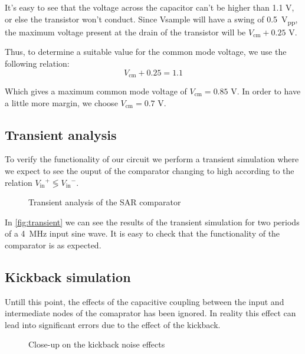 \documentclass{article}
\newcommand*{\subb}[1]{\ensuremath{_{\mathrm{#1}}}}
\begin{document}
 It’s easy to see that the voltage across the capacitor can’t be higher than 1.1 V, or else the transistor won’t conduct. Since Vsample will have a swing of \SI{0.5}{\volt_{pp}}, the maximum voltage present at the drain of the transistor will be $V\subb{cm} + 0.25$ V.

 Thus, to determine a suitable value for the common mode voltage, we use the following relation:
 \begin{equation}
  V\subb{cm} + 0.25=1.1
 \end{equation}

 Which gives a maximum common mode voltage of $V\subb{cm}=0.85$ V. In order to have a little more margin, we choose $V\subb{cm}=0.7$ V.


 \subsection{Transient analysis}
 To verify the functionality of our circuit we perform a transient simulation where we expect to see the ouput of the comparator changing to high according to the relation $V\subb{in}^+\lessgtr V\subb{in}^-$.

 \begin{figure}[!h]
  \centering
  \caption{Transient analysis of the SAR comparator}
  \label{fig:transient}
  
 \end{figure}

 In \autoref{fig:transient} we can see the results of the transient simulation for two periods of a \SI{4}{\MHz} input sine wave. It is easy to check that the functionality of the comparator is as expected.
 \subsection{Kickback simulation}
 Untill this point, the effects of the capacitive coupling between the input and intermediate nodes of the comaprator has been ignored. In reality this effect can lead into significant errors due to the effect of the kickback.

 \begin{figure}[!h]
  \centering
  \caption{Close-up on the kickback noise effects}
  \label{fig:kickback_closeup}
  
 \end{figure}
\end{document}
